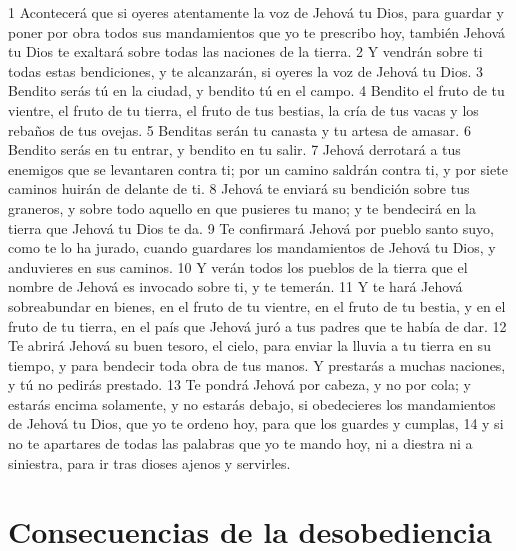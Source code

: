 1 Acontecerá que si oyeres atentamente la voz de Jehová tu Dios, para guardar y poner por obra todos sus mandamientos que yo te prescribo hoy, también Jehová tu Dios te exaltará sobre todas las naciones de la tierra.
2 Y vendrán sobre ti todas estas bendiciones, y te alcanzarán, si oyeres la voz de Jehová tu Dios.
3 Bendito serás tú en la ciudad, y bendito tú en el campo.
4 Bendito el fruto de tu vientre, el fruto de tu tierra, el fruto de tus bestias, la cría de tus vacas y los rebaños de tus ovejas.
5 Benditas serán tu canasta y tu artesa de amasar.
6 Bendito serás en tu entrar, y bendito en tu salir.
7 Jehová derrotará a tus enemigos que se levantaren contra ti; por un camino saldrán contra ti, y por siete caminos huirán de delante de ti.
8 Jehová te enviará su bendición sobre tus graneros, y sobre todo aquello en que pusieres tu mano; y te bendecirá en la tierra que Jehová tu Dios te da.
9 Te confirmará Jehová por pueblo santo suyo, como te lo ha jurado, cuando guardares los mandamientos de Jehová tu Dios, y anduvieres en sus caminos.
10 Y verán todos los pueblos de la tierra que el nombre de Jehová es invocado sobre ti, y te temerán.
11 Y te hará Jehová sobreabundar en bienes, en el fruto de tu vientre, en el fruto de tu bestia, y en el fruto de tu tierra, en el país que Jehová juró a tus padres que te había de dar.
12 Te abrirá Jehová su buen tesoro, el cielo, para enviar la lluvia a tu tierra en su tiempo, y para bendecir toda obra de tus manos. Y prestarás a muchas naciones, y tú no pedirás prestado.
13 Te pondrá Jehová por cabeza, y no por cola; y estarás encima solamente, y no estarás debajo, si obedecieres los mandamientos de Jehová tu Dios, que yo te ordeno hoy, para que los guardes y cumplas,
14 y si no te apartares de todas las palabras que yo te mando hoy, ni a diestra ni a siniestra, para ir tras dioses ajenos y servirles. 

\section{Consecuencias de la desobediencia}

